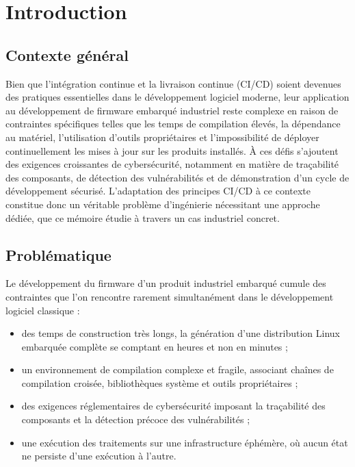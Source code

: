 \chapter{Introduction}
\label{chap:introduction}

\section{Contexte général}
\label{sec:intro-contexte}

Bien que l’intégration continue et la livraison continue (CI/CD) soient devenues 
des pratiques essentielles dans le développement logiciel moderne, leur application 
au développement de firmware embarqué industriel reste complexe en raison de 
contraintes spécifiques telles que les temps de compilation élevés, la dépendance 
au matériel, l’utilisation d’outils propriétaires et l’impossibilité de déployer 
continuellement les mises à jour sur les produits installés. À ces défis s’ajoutent 
des exigences croissantes de cybersécurité, notamment en matière de traçabilité des 
composants, de détection des vulnérabilités et de démonstration d’un cycle de 
développement sécurisé. L’adaptation des principes CI/CD à ce contexte constitue 
donc un véritable problème d’ingénierie nécessitant une approche dédiée, que 
ce mémoire étudie à travers un cas industriel concret.

\section{Problématique}
\label{sec:intro-problematique}

Le développement du firmware d'un produit industriel embarqué cumule des
contraintes que l'on rencontre rarement simultanément dans le développement
logiciel classique :

\begin{itemize}[nosep]
  \item des temps de construction très longs, la génération d'une distribution
        Linux embarquée complète se comptant en heures et non en minutes ;
  \item un environnement de compilation complexe et fragile, associant chaînes
        de compilation croisée, bibliothèques système et outils propriétaires ;
  \item des exigences réglementaires de cybersécurité imposant la traçabilité 
        des composants et la détection précoce des vulnérabilités ;
  \item une exécution des traitements sur une infrastructure éphémère, où 
        aucun état ne persiste d'une exécution à l'autre.
\end{itemize}

